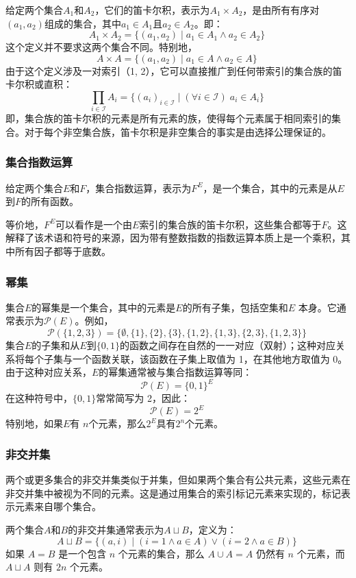 给定两个集合\( A_1 \)和\( A_2 \)，它们的笛卡尔积，表示为\( A_1 \times A_2 \)，是由所有有序对\( (a_1, a_2) \)组成的集合，其中\( a_1 \in A_1 \)且\( a_2 \in A_2 \)。即：
\[
A_1 \times A_2 = \{(a_1, a_2) \mid a_1 \in A_1 \land a_2 \in A_2\}~
\]
这个定义并不要求这两个集合不同。特别地，
\[
A \times A = \{(a_1, a_2) \mid a_1 \in A \land a_2 \in A\}~
\]
由于这个定义涉及一对索引（1, 2），它可以直接推广到任何带索引的集合族的笛卡尔积或直积：
\[
\prod_{i \in \mathcal{I}} A_i = \{(a_i)_{i \in \mathcal{I}} \mid (\forall i \in \mathcal{I}) \; a_i \in A_i\}~
\]
即，集合族的笛卡尔积的元素是所有元素的族，使得每个元素属于相同索引的集合。对于每个非空集合族，笛卡尔积是非空集合的事实是由选择公理保证的。
\subsubsection{集合指数运算}
给定两个集合\( E \)和\( F \)，集合指数运算，表示为\( F^E \)，是一个集合，其中的元素是从\( E \)到\( F \)的所有函数。

等价地，\( F^E \)可以看作是一个由\( E \)索引的集合族的笛卡尔积，这些集合都等于\( F \)。这解释了该术语和符号的来源，因为带有整数指数的指数运算本质上是一个乘积，其中所有因子都等于底数。
\subsubsection{幂集}
集合\( E \)的幂集是一个集合，其中的元素是\( E \)的所有子集，包括空集和\( E \) 本身。它通常表示为\( \mathcal{P}(E) \)。例如，
\[
\mathcal{P}(\{1,2,3\}) = \{\emptyset, \{1\}, \{2\}, \{3\}, \{1,2\}, \{1,3\}, \{2,3\}, \{1,2,3\}\}~
\]
集合\( E \)的子集和从\( E \)到\( \{0, 1\} \)的函数之间存在自然的一一对应（双射）；这种对应关系将每个子集与一个函数关联，该函数在子集上取值为 1，在其他地方取值为 0。由于这种对应关系，\( E \)的幂集通常被与集合指数运算等同：
\[
\mathcal{P}(E) = \{0,1\}^E~
\]
在这种符号中，\( \{0,1\} \)常常简写为 2，因此：
\[
\mathcal{P}(E) = 2^E~
\]
特别地，如果\( E \)有 \( n \)个元素，那么\( 2^E \)具有\( 2^n \)个元素。

\subsubsection{非交并集}
两个或更多集合的非交并集类似于并集，但如果两个集合有公共元素，这些元素在非交并集中被视为不同的元素。这是通过用集合的索引标记元素来实现的，标记表示元素来自哪个集合。

两个集合\( A \)和\( B \)的非交并集通常表示为\( A \sqcup B \)，定义为：
\[
A \sqcup B = \{(a, i) \mid (i = 1 \land a \in A) \lor (i = 2 \land a \in B)\}~
\]
如果 \( A = B \) 是一个包含 \( n \) 个元素的集合，那么 \( A \cup A = A \) 仍然有 \( n \) 个元素，而 \( A \sqcup A \) 则有 \( 2n \) 个元素。

